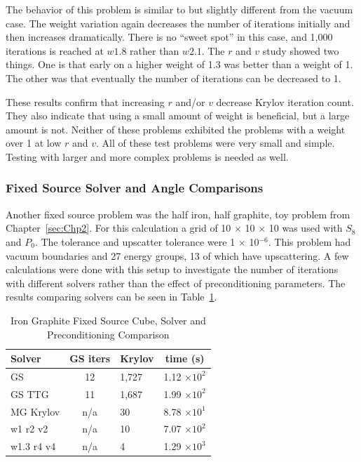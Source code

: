 The behavior of this problem is similar to but slightly different from the vacuum case. The weight variation again decreases the number of iterations initially and then increases dramatically. There is no ``sweet spot'' in this case, and 1,000 iterations is reached at $w1.8$ rather than $w2.1$. The $r$ and $v$ study showed two things. One is that early on a higher weight of 1.3 was better than a weight of 1. The other was that eventually the number of iterations can be decreased to 1. 

These results confirm that increasing $r$ and/or $v$ decrease Krylov iteration count. They also indicate that using a small amount of weight is beneficial, but a large amount is not. Neither of these problems exhibited the problems with a weight over 1 at low $r$ and $v$. All of these test problems were very small and simple. Testing with larger and more complex problems is needed as well. 

\subsubsection{Fixed Source Solver and Angle Comparisons} 
Another fixed source problem was the half iron, half graphite, toy problem from Chapter~\ref{sec:Chp2}. For this calculation a grid of 10 $\times$ 10 $\times$ 10 was used with $S_{8}$ and $P_{0}$. The tolerance and upscatter tolerance were 1 $\times$ 10$^{-6}$. This problem had vacuum boundaries and 27 energy groups, 13 of which have upscattering. A few calculations were done with this setup to investigate the number of iterations with different solvers rather than the effect of preconditioning parameters. The results comparing solvers can be seen in Table~\ref{table:FeC solvers}. 
%
\begin{table}[!h]
\caption{Iron Graphite Fixed Source Cube, Solver and Preconditioning Comparison}
\begin{center}
\begin{tabular}{l c l c}
\hline
Solver & GS iters & Krylov & time (s)\\[0.5ex]
\hline
GS &  12 & 1,727 & 1.12 $\times 10^{2}$ \\
GS TTG & 11 & 1,687 & 1.99 $\times 10^{2}$  \\
MG Krylov & n/a & 30 & 8.78 $\times 10^{1}$ \\
w1 r2 v2 & n/a & 10 & 7.07 $\times 10^{2}$ \\
w1.3 r4 v4 & n/a & 4 & 1.29 $\times 10^{3}$ \\
\hline
\end{tabular}
\end{center}
\label{table:FeC solvers}
\end{table}

